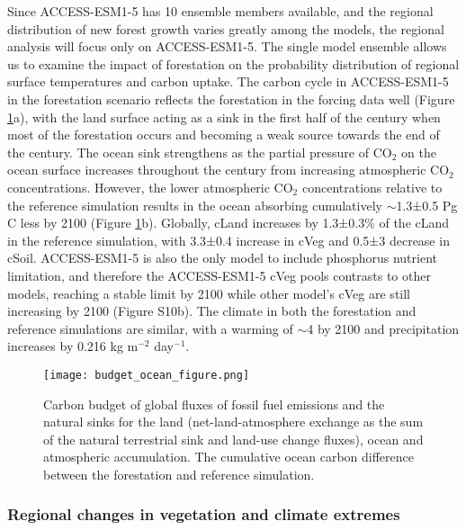 \documentclass[draft]{agujournal2019}
\begin{document}
Since ACCESS-ESM1-5 has 10 ensemble members available, and the regional distribution of new forest growth varies greatly among the models, the regional analysis will focus only on ACCESS-ESM1-5.
The single model ensemble allows us to examine the impact of forestation on the probability distribution of regional surface temperatures and carbon uptake.
The carbon cycle in ACCESS-ESM1-5 in the forestation scenario reflects the forestation in the forcing data well (Figure \ref{fig:global_carbon_budget}a), with the land surface acting as a sink in the first half of the century when most of the forestation occurs and becoming a weak source towards the end of the century.
The ocean sink strengthens as the partial pressure of CO$_2$ on the ocean surface increases throughout the century from increasing atmospheric CO$_2$ concentrations.
However, the lower atmospheric CO$_2$ concentrations relative to the reference simulation results in the ocean absorbing cumulatively $\sim$1.3±0.5 Pg C less by 2100 (Figure \ref{fig:global_carbon_budget}b).
Globally, cLand increases by 1.3±0.3\% of the cLand in the reference simulation, with 3.3±0.4 increase in cVeg and 0.5±3 decrease in cSoil.
ACCESS-ESM1-5 is also the only model to include phosphorus nutrient limitation, and therefore the ACCESS-ESM1-5 cVeg pools contrasts to other models, reaching a stable limit by 2100 while other model's cVeg are still increasing by 2100 (Figure S10b).
The climate in both the forestation and reference simulations are similar, with a warming of $\sim$4 \textcelsius{} by 2100 and precipitation increases by 0.216 kg m$^{-2}$ day$^{-1}$.

\begin{figure}
    \texttt{[image: budget\_ocean\_figure.png]}
    \caption{Carbon budget of global fluxes of fossil fuel emissions and the natural sinks for the land (net-land-atmosphere exchange as the sum of the natural terrestrial sink and land-use change fluxes), ocean and atmospheric accumulation. The cumulative ocean carbon difference between the forestation and reference simulation.}
    \label{fig:global_carbon_budget}
\end{figure}

\subsubsection{Regional changes in vegetation and climate extremes}
\end{document}
